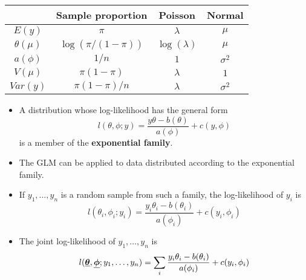 \begin{frame}
  \vspace{1.6cm}
  \begin{table}
    \begin{tabular}{c|ccc}
      \hline
      & Sample proportion & Poisson & Normal\\
      \hline
      $ E(y) $        & $ \pi $               & $ \lambda $       & $ \mu $      \\
      $ \theta(\mu) $ & $ \log(\pi/(1-\pi)) $ & $ \log(\lambda) $ & $ \mu $      \\
      $ a(\phi) $     & $ 1/n $               & $ 1 $             & $ \sigma^2 $ \\
      $ V(\mu) $      & $ \pi(1-\pi) $        & $ \lambda $       & $ 1 $        \\
      $ Var(y) $      & $ \pi(1-\pi)/n $      & $ \lambda $       & $ \sigma^2 $ \\
      \hline
    \end{tabular}
  \end{table}
\end{frame}




\begin{frame}
  \begin{itemize}
    \item A distribution whose log-likelihood has the general form
      $$ l(\theta, \phi; y) = \frac{y\theta - b(\theta)}{a(\phi)} + c(y, \phi) $$
      is a member of the \textbf{exponential family}.
    \item The GLM can be applied to data distributed according to the exponential family.
    \item If $ y_1, \dots, y_n $ is a random sample from such a family, the log-likelihood of $ y_i $ is
      $$ l(\theta_i, \phi_i; y_i) = \frac{y_i\theta_i - b(\theta_i)}{a(\phi_i)} + c(y_i, \phi_i) $$
    \item The joint log-likelihood of $ y_1, \dots, y_n $ is
      $$ l(\boldsymbol{\underline{\theta}}, \boldsymbol{\underline{\phi}}; y_1, \dots, y_n) = \sum_i \frac{y_i\theta_i - b(\theta_i)}{a(\phi_i)} + c(y_i, \phi_i) $$
  \end{itemize}
\end{frame}




